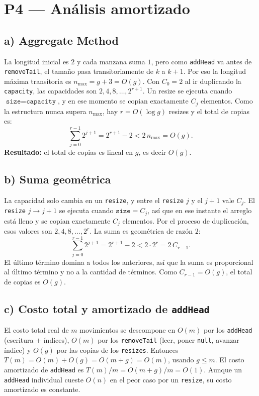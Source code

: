 \documentclass[11pt,a4paper]{article}
\begin{document}


\section*{P4 --- Análisis amortizado}

\subsection*{a) Aggregate Method}

La longitud inicial es $2$ y cada manzana suma $1$, pero como \texttt{addHead} va antes de \texttt{removeTail}, el tamaño pasa transitoriamente de $k$ a $k+1$. Por eso la longitud máxima transitoria es $n_{\max} = g + 3 = O(g)$. Con $C_0 = 2$ al ir duplicando la \texttt{capacity}, las capacidades son $2, 4, 8, \dots, 2^{r+1}$. Un resize se ejecuta cuando $\texttt{size} = \texttt{capacity}$, y en ese momento se copian exactamente $C_j$ elementos. Como la estructura nunca supera $n_{\max}$, hay $r = O(\log g)$ resizes y el total de copias es:
\[
\sum_{j=0}^{r-1} 2^{j+1} = 2^{r+1} - 2 < 2\,n_{\max} = O(g).
\]
\textbf{Resultado:} el total de copias es lineal en $g$, es decir $O(g)$.

\subsection*{b) Suma geométrica}

La capacidad solo cambia en un \texttt{resize}, y entre el \texttt{resize} $j$ y el $j+1$ vale $C_j$. El \texttt{resize} $j \to j+1$ se ejecuta cuando $\texttt{size} = C_j$, así que en ese instante el arreglo está lleno y se copian exactamente $C_j$ elementos. Por el proceso de duplicación, esos valores son $2, 4, 8, \dots, 2^{r}$. La suma es geométrica de razón $2$:
\[
\sum_{j=0}^{r-1} 2^{j+1} = 2^{r+1} - 2 < 2 \cdot 2^{r} = 2\,C_{r-1}.
\]
El último término domina a todos los anteriores, así que la suma es proporcional al último término y no a la cantidad de términos. Como $C_{r-1} = O(g)$, el total de copias es $O(g)$.

\subsection*{c) Costo total y amortizado de \texttt{addHead}}

El costo total real de $m$ movimientos se descompone en $O(m)$ por los \texttt{addHead} (escritura $+$ índices), $O(m)$ por los \texttt{removeTail} (leer, poner \texttt{null}, avanzar índice) y $O(g)$ por las copias de los \texttt{resizes}. Entonces $T(m) = O(m) + O(g) = O(m+g) = O(m)$, usando $g \le m$. El costo amortizado de \texttt{addHead} es $T(m)/m = O(m+g)/m = O(1)$. Aunque un \texttt{addHead} individual cueste $O(n)$ en el peor caso por un \texttt{resize}, su costo amortizado es constante.
\end{document}
